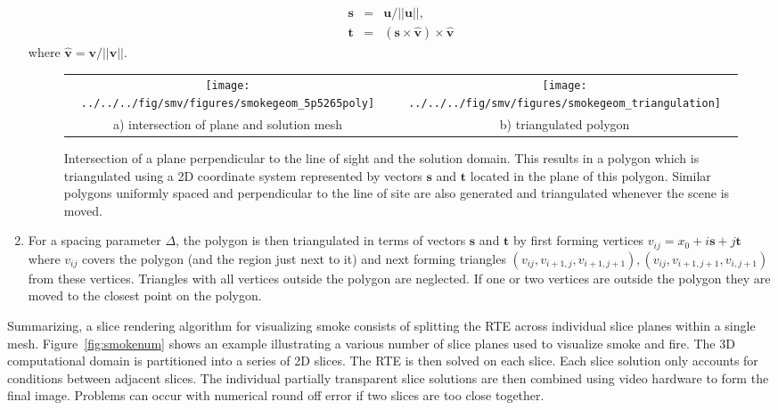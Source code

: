 \documentclass[11pt]{article}
\newcommand{\vvec}[1]{\mathbf{#1}}
\begin{document}
\begin{enumerate}
      \begin{eqnarray*}
    \vvec{s}&=&\vvec{u}/||\vvec{u}||,\\
    \vvec{t}&=&(\vvec{s} \times \vvec{\hat{v}}) \times \vvec{\hat{v}}
    \end{eqnarray*}
    where $\vvec{\hat{v}}=\vvec{v}/||\vvec{v}||$.

\begin{figure}[bph]
\begin{center}
\begin{tabular}{cc}
\texttt{[image: ../../../fig/smv/figures/smokegeom\_5p5265poly]}&
\texttt{[image: ../../../fig/smv/figures/smokegeom\_triangulation]}\\
a) intersection of plane and solution mesh& b) triangulated polygon
\end{tabular}
\end{center}
\caption{Intersection of a plane perpendicular to the line of sight and the solution
domain.  This results in a polygon which is triangulated
using a  2D coordinate system represented by vectors $\vvec{s}$ and $\vvec{t}$ located in the plane of this polygon. 
Similar polygons uniformly spaced and perpendicular to the line of site are also generated and triangulated whenever the scene is moved.}
\label{fig:smoketriangulate}
\end{figure}

\item For a spacing parameter $\Delta$, the polygon is then triangulated in terms of vectors $\vvec{s}$ and $\vvec{t}$ by first
forming vertices $v_{ij}=x_0 + i\vvec{s} + j \vvec{t}$ where $v_{ij}$ covers the polygon (and the region just next to it)
and next forming triangles $(v_{ij},v_{i+1,j},v_{i+1,j+1}), (v_{ij},v_{i+1,j+1},v_{i,j+1}) $
from these vertices.
Triangles with all vertices outside the polygon are neglected.
If one or two vertices are outside the polygon they are moved to the closest point on the polygon.

\end{enumerate}

Summarizing, a slice rendering algorithm for visualizing smoke consists of
splitting the RTE across individual slice planes within a single
mesh.  Figure~\ref{fig:smokenum} shows an example illustrating a various number
of slice planes used to visualize smoke and fire.
The 3D computational domain is partitioned into a series of
2D slices.  The RTE is then solved on each slice.  Each slice
solution only accounts for conditions between adjacent slices.
The individual partially transparent slice solutions are then
combined using video hardware to form the final image.   Problems
can occur with numerical round off error if two slices are too
close together.
\end{document}
